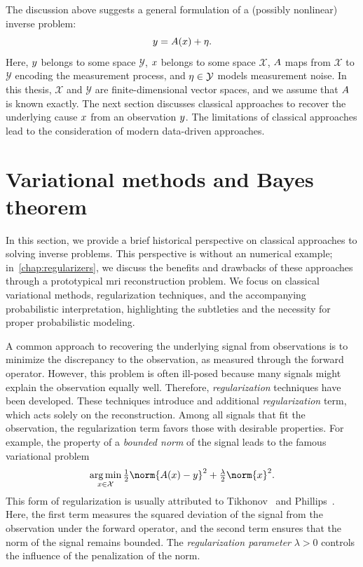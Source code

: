 The discussion above suggests a general formulation of a (possibly nonlinear) inverse problem:
\begin{equation}
	y = A(x) + \eta.
\end{equation}
Here, \( y \) belongs to some space \( \mathcal{Y} \), \( x \) belongs to some space \( \mathcal{X} \), \( A \) maps from \( \mathcal{X} \) to \( \mathcal{Y} \) encoding the measurement process, and \( \eta \in \mathcal{Y} \) models measurement noise.
In this thesis, \( \mathcal{X} \) and \( \mathcal{Y} \) are finite-dimensional vector spaces, and we assume that \( A \) is known exactly.
The next section discusses classical approaches to recover the underlying cause \( x \) from an observation \( y \).
The limitations of classical approaches lead to the consideration of modern data-driven approaches.
\section{Variational methods and Bayes theorem}
\label{sec:variation methods and bayes theorem}
In this section, we provide a brief historical perspective on classical approaches to solving inverse problems.
This perspective is without an numerical example; in~\cref{chap:regularizers}, we discuss the benefits and drawbacks of these approaches through a prototypical \gls{mri} reconstruction problem.
We focus on classical variational methods, regularization techniques, and the accompanying probabilistic interpretation, highlighting the subtleties and the necessity for proper probabilistic modeling.

A common approach to recovering the underlying signal from observations is to minimize the discrepancy to the observation, as measured through the forward operator.
However, this problem is often ill-posed because many signals might explain the observation equally well.
Therefore, \emph{regularization} techniques have been developed.
These techniques introduce and additional \emph{regularization} term, which acts solely on the reconstruction.
Among all signals that fit the observation, the regularization term favors those with desirable properties.
For example, the property of a \emph{bounded norm} of the signal leads to the famous variational problem
\begin{equation}
	\argmin_{\Signal \in \mathcal{X}} \Half \norm{\Forward(\Signal) - \Data}^{\num{2}} + \tfrac{\lambda}{2} \norm{\Signal}^{\num{2}}.
\end{equation}
This form of regularization is usually attributed to Tikhonov~\cite{tikhonov_solution_1963} and Phillips~\cite{phillips_technique_1962}.
Here, the first term measures the squared deviation of the signal from the observation under the forward operator, and the second term ensures that the norm of the signal remains bounded.
The \emph{regularization parameter} \( \lambda > \num{0} \) controls the influence of the penalization of the norm.


